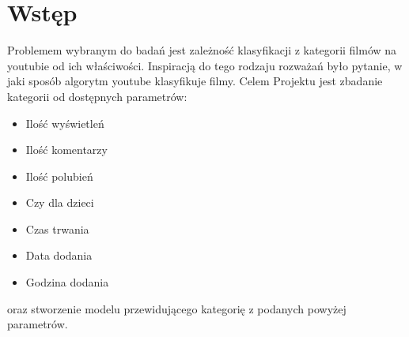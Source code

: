 \section{Wstęp}
\hspace{\parindent}
Problemem wybranym do badań jest zależność klasyfikacji z kategorii filmów na youtubie od ich właściwości. Inspiracją do tego rodzaju rozważań było pytanie, w jaki sposób algorytm youtube klasyfikuje filmy. Celem Projektu jest zbadanie kategorii od dostępnych parametrów: 
\begin{itemize}
  \item Ilość wyświetleń
  \item Ilość komentarzy
  \item Ilość polubień
  \item Czy dla dzieci 
  \item Czas trwania
  \item Data dodania
  \item Godzina dodania
\end{itemize}
oraz stworzenie modelu przewidującego kategorię z podanych powyżej parametrów.

